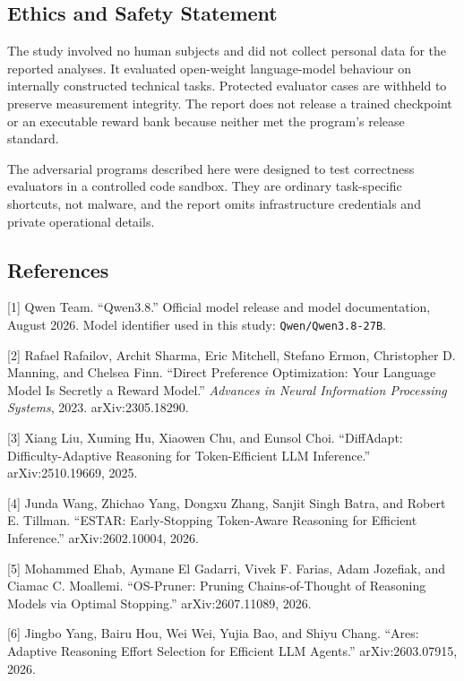 \documentclass[
  9pt,
  letterpaper,
]{article}
\begin{document}
\hypertarget{ethics-and-safety-statement}{%
\subsection{Ethics and Safety
Statement}\label{ethics-and-safety-statement}}

The study involved no human subjects and did not collect personal data
for the reported analyses. It evaluated open-weight language-model
behaviour on internally constructed technical tasks. Protected evaluator
cases are withheld to preserve measurement integrity. The report does
not release a trained checkpoint or an executable reward bank because
neither met the program's release standard.

The adversarial programs described here were designed to test
correctness evaluators in a controlled code sandbox. They are ordinary
task-specific shortcuts, not malware, and the report omits
infrastructure credentials and private operational details.

\hypertarget{references}{%
\subsection{References}\label{references}}

{[}1{]} Qwen Team. ``Qwen3.8.'' Official model release and model
documentation, August 2026. Model identifier used in this study:
\texttt{Qwen/Qwen3.8-27B}.

{[}2{]} Rafael Rafailov, Archit Sharma, Eric Mitchell, Stefano Ermon,
Christopher D. Manning, and Chelsea Finn. ``Direct Preference
Optimization: Your Language Model Is Secretly a Reward Model.''
\emph{Advances in Neural Information Processing Systems}, 2023.
arXiv:2305.18290.

{[}3{]} Xiang Liu, Xuming Hu, Xiaowen Chu, and Eunsol Choi. ``DiffAdapt:
Difficulty-Adaptive Reasoning for Token-Efficient LLM Inference.''
arXiv:2510.19669, 2025.

{[}4{]} Junda Wang, Zhichao Yang, Dongxu Zhang, Sanjit Singh Batra, and
Robert E. Tillman. ``ESTAR: Early-Stopping Token-Aware Reasoning for
Efficient Inference.'' arXiv:2602.10004, 2026.

{[}5{]} Mohammed Ehab, Aymane El Gadarri, Vivek F. Farias, Adam
Jozefiak, and Ciamac C. Moallemi. ``OS-Pruner: Pruning Chains-of-Thought
of Reasoning Models via Optimal Stopping.'' arXiv:2607.11089, 2026.

{[}6{]} Jingbo Yang, Bairu Hou, Wei Wei, Yujia Bao, and Shiyu Chang.
``Ares: Adaptive Reasoning Effort Selection for Efficient LLM Agents.''
arXiv:2603.07915, 2026.
\end{document}
